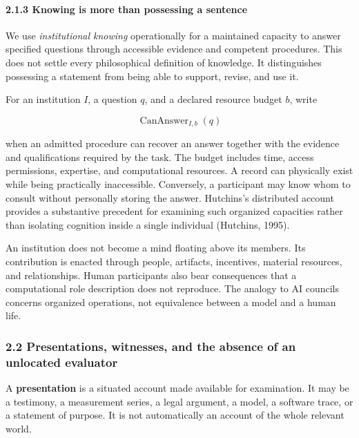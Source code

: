 \documentclass[
  10pt,
]{article}
\begin{document}
\paragraph{2.1.3 Knowing is more than possessing a sentence}\label{knowing-is-more-than-possessing-a-sentence}

We use \emph{institutional knowing} operationally for a maintained capacity to answer specified questions through accessible evidence and competent procedures. This does not settle every philosophical definition of knowledge. It distinguishes possessing a statement from being able to support, revise, and use it.

For an institution \protect\hypertarget{math-E0001-0001}{}{\(I\)}, a question \protect\hypertarget{math-E0002-0002}{}{\(q\)}, and a declared resource budget \protect\hypertarget{math-E0003-0003}{}{\(b\)}, write

\protect\hypertarget{math-E0004-0004}{}{\[
\operatorname{CanAnswer}_{I,b}(q)
\]}

when an admitted procedure can recover an answer together with the evidence and qualifications required by the task. The budget includes time, access permissions, expertise, and computational resources. A record can physically exist while being practically inaccessible. Conversely, a participant may know whom to consult without personally storing the answer. Hutchins's distributed account provides a substantive precedent for examining such organized capacities rather than isolating cognition inside a single individual (Hutchins, 1995).

An institution does not become a mind floating above its members. Its contribution is enacted through people, artifacts, incentives, material resources, and relationships. Human participants also bear consequences that a computational role description does not reproduce. The analogy to AI councils concerns organized operations, not equivalence between a model and a human life.

\subsubsection{2.2 Presentations, witnesses, and the absence of an unlocated evaluator}\label{presentations-witnesses-and-the-absence-of-an-unlocated-evaluator}

A \textbf{presentation} is a situated account made available for examination. It may be a testimony, a measurement series, a legal argument, a model, a software trace, or a statement of purpose. It is not automatically an account of the whole relevant world.
\end{document}
